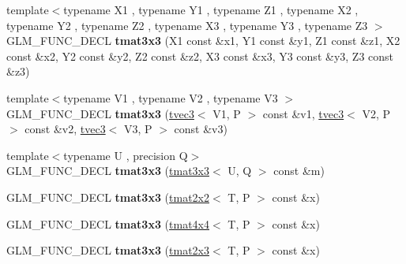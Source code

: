 \begin{DoxyCompactItemize}
\item 
{\footnotesize template$<$typename X1 , typename Y1 , typename Z1 , typename X2 , typename Y2 , typename Z2 , typename X3 , typename Y3 , typename Z3 $>$ }\\G\+L\+M\+\_\+\+F\+U\+N\+C\+\_\+\+D\+E\+CL {\bfseries tmat3x3} (X1 const \&x1, Y1 const \&y1, Z1 const \&z1, X2 const \&x2, Y2 const \&y2, Z2 const \&z2, X3 const \&x3, Y3 const \&y3, Z3 const \&z3)\hypertarget{structglm_1_1detail_1_1tmat3x3_a9231c5d0ebe3a535d602e4135b9019c2}{}\label{structglm_1_1detail_1_1tmat3x3_a9231c5d0ebe3a535d602e4135b9019c2}

\item 
{\footnotesize template$<$typename V1 , typename V2 , typename V3 $>$ }\\G\+L\+M\+\_\+\+F\+U\+N\+C\+\_\+\+D\+E\+CL {\bfseries tmat3x3} (\hyperlink{structglm_1_1detail_1_1tvec3}{tvec3}$<$ V1, P $>$ const \&v1, \hyperlink{structglm_1_1detail_1_1tvec3}{tvec3}$<$ V2, P $>$ const \&v2, \hyperlink{structglm_1_1detail_1_1tvec3}{tvec3}$<$ V3, P $>$ const \&v3)\hypertarget{structglm_1_1detail_1_1tmat3x3_aa698f62dc4eafac9096370495dc6f74c}{}\label{structglm_1_1detail_1_1tmat3x3_aa698f62dc4eafac9096370495dc6f74c}

\item 
{\footnotesize template$<$typename U , precision Q$>$ }\\G\+L\+M\+\_\+\+F\+U\+N\+C\+\_\+\+D\+E\+CL {\bfseries tmat3x3} (\hyperlink{structglm_1_1detail_1_1tmat3x3}{tmat3x3}$<$ U, Q $>$ const \&m)\hypertarget{structglm_1_1detail_1_1tmat3x3_a167e0a30ab00a30c1f3e7c528a8f4aee}{}\label{structglm_1_1detail_1_1tmat3x3_a167e0a30ab00a30c1f3e7c528a8f4aee}

\item 
G\+L\+M\+\_\+\+F\+U\+N\+C\+\_\+\+D\+E\+CL {\bfseries tmat3x3} (\hyperlink{structglm_1_1detail_1_1tmat2x2}{tmat2x2}$<$ T, P $>$ const \&x)\hypertarget{structglm_1_1detail_1_1tmat3x3_a421b7ee49440a7e1f0a576895f6e6363}{}\label{structglm_1_1detail_1_1tmat3x3_a421b7ee49440a7e1f0a576895f6e6363}

\item 
G\+L\+M\+\_\+\+F\+U\+N\+C\+\_\+\+D\+E\+CL {\bfseries tmat3x3} (\hyperlink{structglm_1_1detail_1_1tmat4x4}{tmat4x4}$<$ T, P $>$ const \&x)\hypertarget{structglm_1_1detail_1_1tmat3x3_a38cd720277c46b3768db3318960649d3}{}\label{structglm_1_1detail_1_1tmat3x3_a38cd720277c46b3768db3318960649d3}

\item 
G\+L\+M\+\_\+\+F\+U\+N\+C\+\_\+\+D\+E\+CL {\bfseries tmat3x3} (\hyperlink{structglm_1_1detail_1_1tmat2x3}{tmat2x3}$<$ T, P $>$ const \&x)\hypertarget{structglm_1_1detail_1_1tmat3x3_a41ebff3cc8fb20c2e47684333186d1db}{}\label{structglm_1_1detail_1_1tmat3x3_a41ebff3cc8fb20c2e47684333186d1db}


\end{DoxyCompactItemize}
